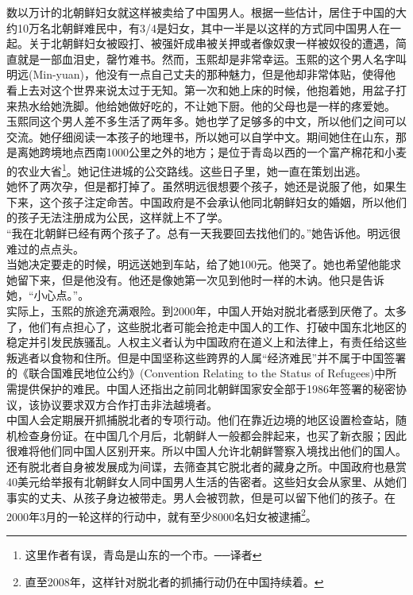 \begin{multicols}{\theparacolNo}
数以万计的北朝鲜妇女就这样被卖给了中国男人。根据一些估计，居住于中国的大约10万名北朝鲜难民中，有3/4是妇女，其中一半是以这样的方式同中国男人在一起。关于北朝鲜妇女被殴打、被强奸成串被关押或者像奴隶一样被奴役的遭遇，简直就是一部血泪史，罄竹难书。然而，玉熙却是非常幸运。玉熙的这个男人名字叫明远(Min-yuan)，他没有一点自己丈夫的那种魅力，但是他却非常体贴，使得他看上去对这个世界来说太过于无知。第一次和她上床的时候，他抱着她，用盆子打来热水给她洗脚。他给她做好吃的，不让她下厨。他的父母也是一样的疼爱她。\\

玉熙同这个男人差不多生活了两年多。她也学了足够多的中文，所以他们之间可以交流。她仔细阅读一本孩子的地理书，所以她可以自学中文。期间她住在山东，那是离她跨境地点西南1000公里之外的地方；是位于青岛以西的一个富产棉花和小麦的农业大省\footnote{这里作者有误，青岛是山东的一个市。──译者}。她记住进城的公交路线。这些日子里，她一直在策划出逃。\\

她怀了两次孕，但是都打掉了。虽然明远很想要个孩子，她还是说服了他，如果生下来，这个孩子注定命苦。中国政府是不会承认他同北朝鲜妇女的婚姻，所以他们的孩子无法注册成为公民，这样就上不了学。\\

“我在北朝鲜已经有两个孩子了。总有一天我要回去找他们的。”她告诉他。明远很难过的点点头。\\

当她决定要走的时候，明远送她到车站，给了她100元。他哭了。她也希望他能求她留下来，但是他没有。他还是像她第一次见到他时一样的木讷。他只是告诉她，“小心点。”。\\

实际上，玉熙的旅途充满艰险。到2000年，中国人开始对脱北者感到厌倦了。太多了，他们有点担心了，这些脱北者可能会抢走中国人的工作、打破中国东北地区的稳定并引发民族骚乱。人权主义者认为中国政府在道义上和法律上，有责任给这些叛逃者以食物和住所。但是中国坚称这些跨界的人属“经济难民”并不属于中国签署的《联合国难民地位公约》(Convention Relating to the Status of Refugees)中所需提供保护的难民。中国人还指出之前同北朝鲜国家安全部于1986年签署的秘密协议，该协议要求双方合作打击非法越境者。\\

中国人会定期展开抓捕脱北者的专项行动。他们在靠近边境的地区设置检查站，随机检查身份证。在中国几个月后，北朝鲜人一般都会胖起来，也买了新衣服；因此很难将他们同中国人区别开来。所以中国人允许北朝鲜警察入境找出他们的国人。还有脱北者自身被发展成为间谍，去筛查其它脱北者的藏身之所。中国政府也悬赏40美元给举报有北朝鲜女人同中国男人生活的告密者。这些妇女会从家里、从她们事实的丈夫、从孩子身边被带走。男人会被罚款，但是可以留下他们的孩子。在2000年3月的一轮这样的行动中，就有至少8000名妇女被逮捕\footnote{直至2008年，这样针对脱北者的抓捕行动仍在中国持续着。}。\\


\end{multicols}
